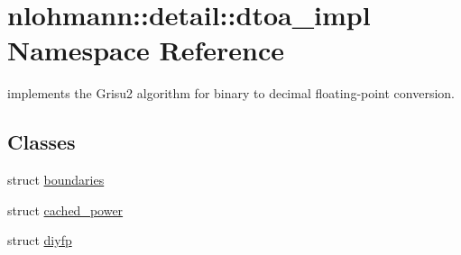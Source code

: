 \hypertarget{namespacenlohmann_1_1detail_1_1dtoa__impl}{}\section{nlohmann\+::detail\+::dtoa\+\_\+impl Namespace Reference}
\label{namespacenlohmann_1_1detail_1_1dtoa__impl}


implements the Grisu2 algorithm for binary to decimal floating-\/point conversion.  


\subsection*{Classes}
\begin{DoxyCompactItemize}
\item 
struct \mbox{\hyperlink{structnlohmann_1_1detail_1_1dtoa__impl_1_1boundaries}{boundaries}}
\item 
struct \mbox{\hyperlink{structnlohmann_1_1detail_1_1dtoa__impl_1_1cached__power}{cached\+\_\+power}}
\item 
struct \mbox{\hyperlink{structnlohmann_1_1detail_1_1dtoa__impl_1_1diyfp}{diyfp}}
\end{DoxyCompactItemize}
